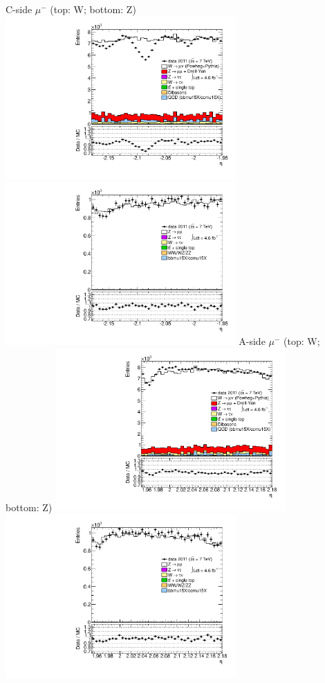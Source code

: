  {
\colb[T]
C-side $\mu^{-}$ (top: W; bottom: Z)
\centering
\includegraphics[width=0.66\textwidth]{dates/20130306/figures/both/W_10_C_stack_l_eta_NEG} \\
\includegraphics[width=0.66\textwidth]{dates/20130306/figures/both/Z_10_C_stack_lN_eta_ALL.pdf}
A-side $\mu^{-}$ (top: W; bottom: Z)
\centering
\includegraphics[width=0.66\textwidth]{dates/20130306/figures/both/W_10_A_stack_l_eta_NEG} \\
\includegraphics[width=0.66\textwidth]{dates/20130306/figures/both/Z_10_A_stack_lN_eta_ALL.pdf} 
\cole
}
